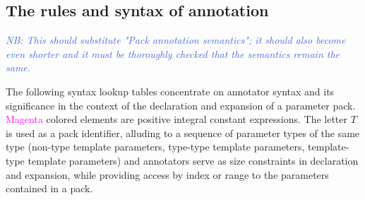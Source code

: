 
\subsection{The rules and syntax of annotation}
\textcolor{RoyalBlue}{\textit{NB: This should substitute "Pack annotation semantics"; it should also become even shorter and it must be thoroughly checked that the semantics remain the same.}}

\p The following syntax lookup tables concentrate on annotator syntax and its significance in the context of the declaration and expansion of a parameter pack.
\textcolor{Magenta}{Magenta} colored elements are positive integral constant expressions.
The letter $T$ is used as a pack identifier, alluding to a sequence of parameter types of the same type (non-type template parameters, type-type template parameters, template-type template parameters) and annotators serve as size constraints in declaration and expansion, while providing access by index or range to the parameters contained in a pack.
